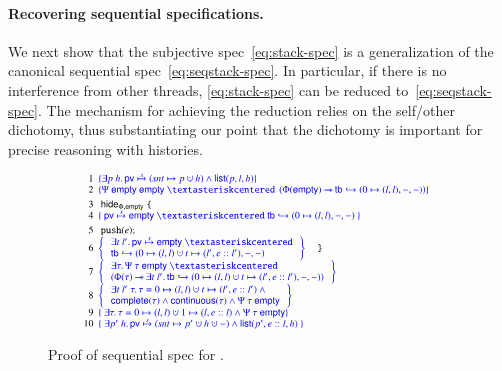 \paragraph{Recovering sequential specifications.}\label{sec:rest-seq}
%
We next show that the subjective spec~\eqref{eq:stack-spec} is a
generalization of the canonical sequential
spec~\eqref{eq:seqstack-spec}. In particular, if there is no
interference from other threads, \eqref{eq:stack-spec} can be reduced
to~\eqref{eq:seqstack-spec}. The mechanism for achieving the reduction
relies on the self/other dichotomy, thus substantiating our point that
the dichotomy is important for precise reasoning with histories.

\begin{wrapfigure}{r}{6.0cm}
\centering
\[
{\scriptsize
\hspace{-5pt}
\begin{array}{r@{\ \ }l}
  \Num{1}& \sspec{\exists p~h\ldot \hpriv \spts (\sent \hpts p \hunion h) \aand \llist(p, l, h)} 
  \\
  \Num{2} & \sspec{\Psi\ \hempty\ \hempty~\sep~\left(\Phi(\hempty)
      \wand \histso{\htb}{0 \hpts (l, l), -, -} \right) }

  \\[2.5pt]
  \Num{3} &  ~\mathsf{hide}_{\Phi, \hempty}~\esc{\{} ~  
  \\
  \Num{4} & 
  \sspec{~\hpriv \spts \hempty ~\sep~ 
    \histso{\htb}{0 \hpts (l, l), -, -}  ~} 
  \\[2.5pt]
  \Num{5} &  ~\esc{push}(e); ~  
  \\
  \Num{6} &
  \spec{\begin{array}{l}
      \exists t~l'\ldot \hpriv \spts \hempty ~\sep\\
    \histso{\htb}{0 \hpts (l, l) \hunion t \hpts (l', e::l'), -, -}
   \end{array}} ~~~~~\esc{\}} 
  \\[2.5pt]
  \Num{7} &
  \spec{\begin{array}{l}
  \exists \hist\ldot \Psi~\hist~\hempty~\sep \\
   (\Phi(\hist) \wand \exists t~l'\ldot \histso{\htb}{0 \hpts  (l, l)
     \hunion t \hpts  (l', e::l'), -, -})
 \end{array}} 
  \\[3.5pt]
  \Num{8} &
  \spec{\begin{array}{l}
          \exists t~l'~\hist\ldot\hist = 0 \hpts (l, l) \hunion t \hpts (l', e::l') \aand \hbox{}\\
          \mathsf{complete}(\hist) \aand \mathsf{continuous}(\hist) \aand \Psi~\hist~\hempty
         \end{array}}
       \\[2.5pt]
  \Num{9} &
  \sspec{~\exists \hist\ldot \hist = 0 \hpts (l, l) \hunion 1 \hpts (l, e::l) \aand \Psi~\hist~\hempty}\\
  \Num{10}& \sspec{~\exists p'~h\ldot \hpriv \spts (\sent \hpts p' \hunion h \hunion -) \aand \llist(p', e::l, h)~}
\end{array}
}
\]
\caption{Proof of sequential spec for .}
\label{fig:seq-proof}
\end{wrapfigure}
